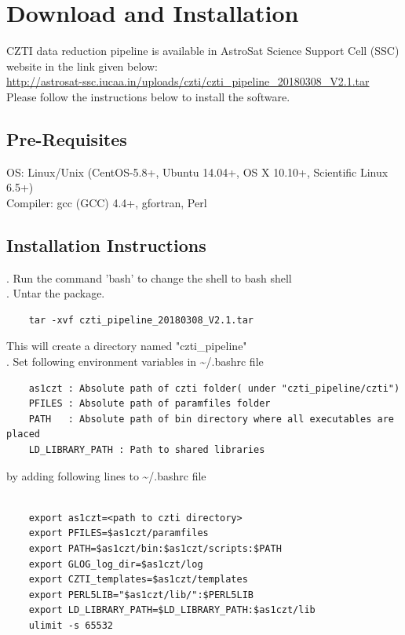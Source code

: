 \documentclass[11pt,oneside,a4paper]{article}
\begin{document}
\newpage

\section{Download and Installation}

CZTI data reduction pipeline is available in AstroSat Science Support Cell (SSC) website 
in the link given below:\\

\url{http://astrosat-ssc.iucaa.in/uploads/czti/czti_pipeline_20180308_V2.1.tar} \\

\noindent Please follow the instructions below to install the software. 

\subsection*{Pre-Requisites}
    OS: Linux/Unix (CentOS-5.8+, Ubuntu 14.04+, OS X 10.10+, Scientific Linux 6.5+)\\
    Compiler: gcc (GCC) 4.4+, gfortran, Perl 

\subsection*{Installation Instructions}

. Run the command 'bash' to change the shell to bash shell \\ 

. Untar the package.
\begin{verbatim}
    tar -xvf czti_pipeline_20180308_V2.1.tar
\end{verbatim}

    This will create a directory named "czti\_pipeline" \\ 
 
. Set following environment variables in  \textasciitilde/.bashrc file

\begin{verbatim}
    as1czt : Absolute path of czti folder( under "czti_pipeline/czti") 
    PFILES : Absolute path of paramfiles folder 
    PATH   : Absolute path of bin directory where all executables are placed 
    LD_LIBRARY_PATH : Path to shared libraries 
\end{verbatim}

by adding following lines to  \textasciitilde/.bashrc file
\begin{verbatim}

    export as1czt=<path to czti directory>
    export PFILES=$as1czt/paramfiles
    export PATH=$as1czt/bin:$as1czt/scripts:$PATH
    export GLOG_log_dir=$as1czt/log
    export CZTI_templates=$as1czt/templates
    export PERL5LIB="$as1czt/lib/":$PERL5LIB    
    export LD_LIBRARY_PATH=$LD_LIBRARY_PATH:$as1czt/lib
	ulimit -s 65532
\end{verbatim}
\end{document}
